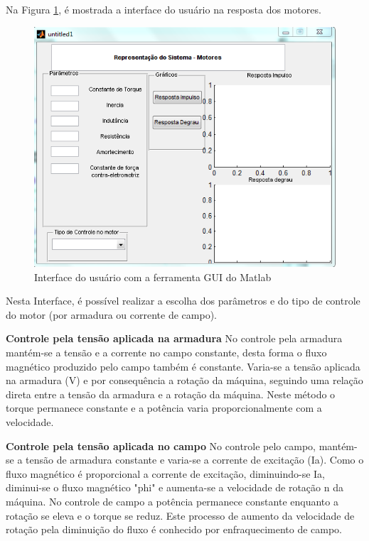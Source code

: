 Na Figura \ref{simulacao1}, é mostrada a interface do usuário na resposta dos motores.

\begin{figure}[H]
		\centering
			\includegraphics[scale=1.0]{figuras/simulacao1.png}
		\caption{Interface do usuário com a ferramenta GUI do Matlab}
		\label{simulacao1}
\end{figure}

Nesta Interface, é possível realizar a escolha dos parâmetros e do tipo de controle do motor (por armadura ou corrente de campo).

\textbf{Controle pela tensão aplicada na armadura}
No controle pela armadura mantém-se a tensão e a corrente no campo constante, desta forma o fluxo magnético produzido pelo campo também é constante. Varia-se a tensão aplicada na armadura (V) e por consequência a rotação da máquina, seguindo uma relação direta entre a tensão da armadura e a rotação da máquina. Neste método o torque permanece constante e a potência varia proporcionalmente com a velocidade.

\textbf{Controle pela tensão aplicada no campo}
No controle pelo campo, mantém-se a tensão de armadura constante e varia-se a corrente de excitação (Ia). Como o fluxo magnético é proporcional a corrente de excitação, diminuindo-se Ia, diminui-se o fluxo magnético "phi" e aumenta-se a velocidade de rotação n da máquina. No controle de campo a potência permanece constante enquanto a rotação se eleva e o torque se reduz. Este processo de aumento da velocidade de rotação pela diminuição do fluxo é conhecido por enfraquecimento de campo.

